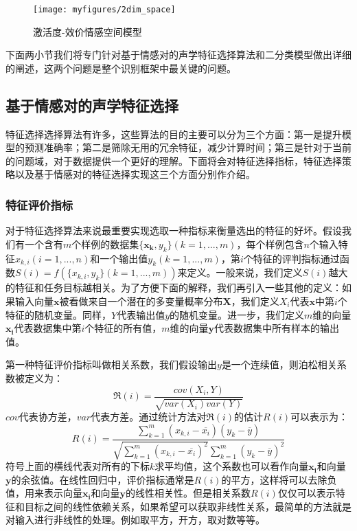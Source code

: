 \begin{figure}[H] %
    \centering
    \texttt{[image: myfigures/2dim\_space]}
    \caption{激活度-效价情感空间模型}
    \label{fig:xfig1}
\end{figure}

下面两小节我们将专门针对基于情感对的声学特征选择算法和二分类模型做出详细的阐述，这两个问题是整个识别框架中最关键的问题。

\subsection{基于情感对的声学特征选择}
特征选择选择算法有许多，这些算法的目的主要可以分为三个方面：第一是提升模型的预测准确率；第二是筛除无用的冗余特征，减少计算时间；第三是针对于当前的问题域，对于数据提供一个更好的理解。下面将会对特征选择指标，特征选择策略以及基于情感对的特征选择实现这三个方面分别作介绍。

\subsubsection{特征评价指标}
对于特征选择算法来说最重要实现选取一种指标来衡量选出的特征的好坏。假设我们有一个含有$m$个样例的数据集$\{\mathbf{x_k}, y_k\}(k=1,...,m)$，每个样例包含$n$个输入特征$x_{k,i}(i=1,...,n)$和一个输出值$y_k(k=1,...,m)$，第$i$个特征的评判指标通过函数$S(i)=f(\{x_{k,i}, y_k\}(k=1,...,m))$来定义。一般来说，我们定义$S(i)$越大的特征和任务目标越相关。为了方便下面的解释，我们再引入一些其他的定义：如果输入向量$\mathbf{x}$被看做来自一个潜在的多变量概率分布$\mathbf{X}$，我们定义$X_i$代表$\mathbf{x}$中第$i$个特征的随机变量。同样，$Y$代表输出值$y$的随机变量。进一步，我们定义$m$维的向量$\mathbf{x_i}$代表数据集中第$i$个特征的所有值，$m$维的向量$\mathbf{y}$代表数据集中所有样本的输出值。

第一种特征评价指标叫做相关系数，我们假设输出$y$是一个连续值，则泊松相关系数被定义为：
\begin{equation}
\label{equ:pearson_cc}
    \Re(i) = \frac{cov(X_i, Y)}{\sqrt{var(X_i)var(Y)}}
\end{equation}
$cov$代表协方差，$var$代表方差。通过统计方法对$\Re(i)$的估计$R(i)$可以表示为：
\begin{equation}
\label{equ:pearson_cc_real}
    R(i) = \frac{\sum_{k=1}^{m}(x_{k,i} - \overline{x_i})(y_k - \overline{y})}{\sqrt{\sum_{k=1}^{m}(x_{k,i} - \overline{x_i})^2}\sum_{k=1}^{m}(y_k - \overline{y})^2}
\end{equation}
符号上面的横线代表对所有的下标$k$求平均值，这个系数也可以看作向量$\mathbf{x_i}$和向量$\mathbf{y}$的余弦值。在线性回归中，评价指标通常是$R(i)$的平方，这样将可以去除负值，用来表示向量$\mathbf{x_i}$和向量$\mathbf{y}$的线性相关性。但是相关系数$R(i)$仅仅可以表示特征和目标之间的线性依赖关系，如果希望可以获取非线性关系，最简单的方法就是对输入进行非线性的处理。例如取平方，开方，取对数等等。

